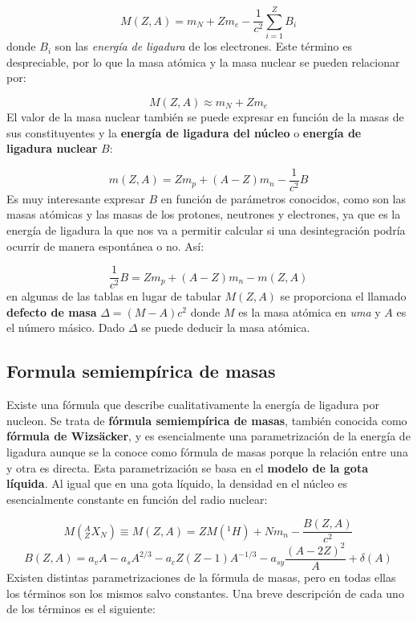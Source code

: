 \begin{equation}
	M(Z,A) = m_N + Zm_e - \frac{1}{c^2} \sum_{i=1}^Z B_i
\end{equation}
donde $B_i$ son las \textit{energía de ligadura} de los electrones. Este término es despreciable, por lo que la masa atómica y la masa nuclear se pueden relacionar por:

\begin{equation}
	M(Z,A) \approx m_N + Zm_e
\end{equation}
El valor de la masa nuclear también se puede expresar en función de la masas de sus constituyentes y la \textbf{energía de ligadura del núcleo} o \textbf{energía de ligadura nuclear} $B$:

\begin{equation}
	m(Z,A) =Zm_p + (A-Z)m_n - \frac{1}{c^2} B
\end{equation}
Es muy interesante expresar $B$ en función de parámetros conocidos, como son las masas atómicas y las masas de los protones, neutrones y electrones, ya que es la energía de ligadura la que nos va a permitir calcular si una desintegración podría ocurrir de manera espontánea o no. Así:

\begin{equation}
	\frac{1}{c^2} B = Zm_p + (A-Z)m_n - m(Z,A)
\end{equation}
en algunas de las tablas en lugar de tabular $M(Z,A)$ se proporciona el llamado \textbf{defecto de masa} $\Delta = (M-A)c^2$ donde $M$ es la masa atómica en \textit{uma} y $A$ es el número másico. Dado $\Delta$ se puede deducir la masa atómica.



\subsection{Formula semiempírica de masas}

Existe una fórmula que describe cualitativamente la energía de ligadura por nucleon. Se trata de \textbf{fórmula semiempírica de masas}, también conocida como \textbf{fórmula de Wizsäcker}, y es esencialmente una parametrización de la energía de ligadura aunque se la conoce como fórmula de masas porque la relación entre una y otra es directa. Esta parametrización se basa en el \textbf{modelo de la gota líquida}. Al igual que en una gota líquido, la densidad en el núcleo es esencialmente constante en función del radio nuclear:

\begin{equation}
	M(^A_ZX_N) \equiv M(Z,A) = ZM(^1 H) + Nm_n - \frac{B(Z,A)}{c^2}
\end{equation}
\begin{equation}
	B(Z,A) = a_v A - a_s A^{2/3} - a_c Z(Z-1) A^{-1/3} - a_{sy} \frac{(A-2Z)^2}{A} + \delta (A)
\end{equation}
Existen distintas parametrizaciones de la fórmula de masas, pero en todas ellas los términos son los mismos salvo constantes. Una breve descripción de cada uno de los términos es el siguiente:

